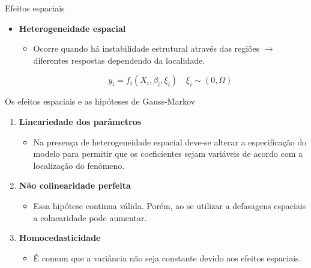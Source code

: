 \documentclass[aspectratio=169]{beamer}
\begin{document}
\begin{frame}{Efeitos espaciais}
	\begin{itemize}
		\item \textbf{Heterogeneidade espacial}
		\vspace{0.5cm}
		\begin{itemize}
			\item Ocorre quando há instabilidade estrutural através das regiões $\rightarrow$ diferentes respostas dependendo da localidade.
			\vspace{0.5cm}
			\begin{block}{}
			    $$y_i = f_i(X_i,\beta_i,\xi_i) \quad \xi_i \sim (0,\Omega)$$
			\end{block}
		\end{itemize}
	\end{itemize}
	\vspace{0.5cm}
\end{frame}

\begin{frame}{Os efeitos espaciais e as hipóteses de Gauss-Markov}
    \begin{enumerate}
        \item \textbf{Lineariedade dos parâmetros}
            \begin{itemize}
                \item Na presença de heterogeneidade espacial deve-se alterar a especificação do modelo para permitir que os coeficientes sejam variáveis de acordo com a localização do fenômeno.
            \end{itemize}
        \vspace{0.5cm}
        \item \textbf{Não colinearidade perfeita}
            \begin{itemize}
                \item Essa hipótese continua válida. Porém, ao se utilizar a defasagens espaciais a colnearidade pode aumentar. 
            \end{itemize}
        \vspace{0.5cm}
        \item \textbf{Homocedasticidade}
            \begin{itemize}
                \item É comum que a variância não seja constante devido aos efeitos espaciais. 
            \end{itemize}
    \end{enumerate}
\end{frame}
\end{document}
